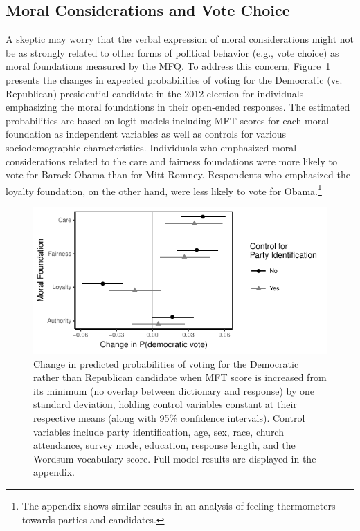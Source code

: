 \documentclass[12pt]{article}
\begin{document}
\subsection*{Moral Considerations and Vote Choice}

A skeptic may worry that the verbal expression of moral considerations might not be as strongly related to other forms of political behavior (e.g., vote choice) as moral foundations measured by the MFQ. To address this concern, Figure~\ref{fig:logit_vote} presents the changes in expected probabilities of voting for the Democratic (vs. Republican) presidential candidate in the 2012 election for individuals emphasizing the moral foundations in their open-ended responses. The estimated probabilities are based on logit models including MFT scores for each moral foundation as independent variables as well as controls for various sociodemographic characteristics. Individuals who emphasized moral considerations related to the care and fairness foundations were more likely to vote for Barack Obama than for Mitt Romney. Respondents who emphasized the loyalty foundation, on the other hand, were less likely to vote for Obama.\footnote{The appendix shows similar results in an analysis of feeling thermometers towards parties and candidates.}

\begin{figure}[ht]\centering
\includegraphics[scale=.9]{../calc/fig/logit_vote.pdf}
\caption{Change in predicted probabilities of voting for the Democratic rather than Republican candidate when MFT score is increased from its minimum (no overlap between dictionary and response) by one standard deviation, holding control variables constant at their respective means (along with 95\% confidence intervals). Control variables include party identification, age, sex, race, church attendance, survey mode, education, response length, and the Wordsum vocabulary score. Full model results are displayed in the appendix.
}\label{fig:logit_vote}
\end{figure}
\end{document}
